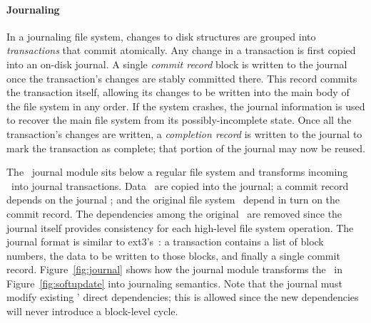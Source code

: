 
\paragraph{Journaling}
\label{sec:using:journal}

In a journaling file system, changes to disk structures are grouped into
\emph{transactions} that commit atomically.
%
Any change in a transaction is first copied into an on-disk journal.
%
A single \emph{commit record} block is written to the journal once the
transaction's changes are stably committed there.
%
This record commits the transaction itself, allowing its changes to be
written into the main body of the file system in any order.
%
If the system crashes, the journal information is used to recover the main
file system from its possibly-incomplete state.
%
Once all the transaction's changes are written, a \emph{completion record}
is written to the journal to mark the transaction as complete; that portion
of the journal may now be reused.

\begin{comment}
the journal point the transaction itself has the commit record
has been written, the changes (which collectively are called a
\emph{transaction}) are considered to have been made to the file system: if
the system crashes, the data from the journal will be copied into the main
file system as part of recovery. After the commit record has been written,
the original changes may be written in any order desired, and once they
have been written, the commit record may be erased and the portion of the
journal storing the data it referenced can be reused.
\end{comment}

The \Kudos\ journal module sits below a regular file system and transforms
incoming \patches\ into journal transactions.
%
Data \patches\ are copied into the journal; a commit record depends on the
journal \patches; and the original file system \patches\ depend in turn on the
commit record.
%
The dependencies among the original \patches\ are removed since the journal
itself provides consistency for each high-level file system operation.
%
The journal format is similar to ext3's~\cite{tweedie98journaling}: a
transaction contains a list of block numbers, the data to be written to
those blocks, and finally a single commit record.
%
Figure~\ref{fig:journal} shows how the journal module transforms the
\patches\ in Figure~\ref{fig:softupdate} into journaling semantics.
%
Note that the journal must modify existing \patches' direct dependencies;
this is allowed since the new dependencies will never introduce a
block-level cycle.


